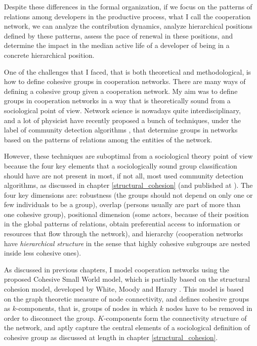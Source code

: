 Despite these differences in the formal organization, if we focus on the patterns of relations among developers in the productive process, what I call the cooperation network, we can analyze the contribution dynamics, analyze hierarchical positions defined by these patterns, assess the pace of renewal in these positions, and determine the impact in the median active life of a developer of being in a concrete hierarchical position.

One of the challenges that I faced, that is both theoretical and methodological, is how to define cohesive groups in cooperation networks. There are many ways of defining a cohesive group given a cooperation network. My aim was to define groups in cooperation networks in a way that is theoretically sound from a sociological point of view. Network science is nowadays quite interdisciplinary, and a lot of physicist have recently proposed a bunch of techniques, under the label of community detection algorithms \citep{fortunato:2010}, that determine groups in networks based on the patterns of relations among the entities of the network.

However, these techniques are suboptimal from a sociological theory point of view because the four key elements that a sociologically sound group classification should have are not present in most, if not all, most used community detection algorithms, as discussed in chapter \ref{structural_cohesion} (and published at \citep{torrents:2015}). The four key dimensions are: robustness (the groups should not depend on only one or few individuals to be a group), overlap (persons usually are part of more than one cohesive group), positional dimension (some actors, because of their position in the global patterns of relations, obtain preferential access to information or resources that flow through the network), and hierarchy (cooperation networks have \emph{hierarchical structure} in the sense that highly cohesive subgroups are nested inside less cohesive ones).

As discussed in previous chapters, I model cooperation networks using the proposed Cohesive Small World model, which is partially based on the structural cohesion model, developed by White, Moody and Harary \citep{white:2001, moody:2003}. This model is based on the graph theoretic measure of node connectivity, and defines cohesive groups as $k$-components, that is, groups of nodes in which $k$ nodes have to be removed in order to disconnect the group. $K$-components form the connectivity structure of the network, and aptly capture the central elements of a sociological definition of cohesive group \citep{torrents:2015} as discussed at length in chapter \ref{structural_cohesion}.

